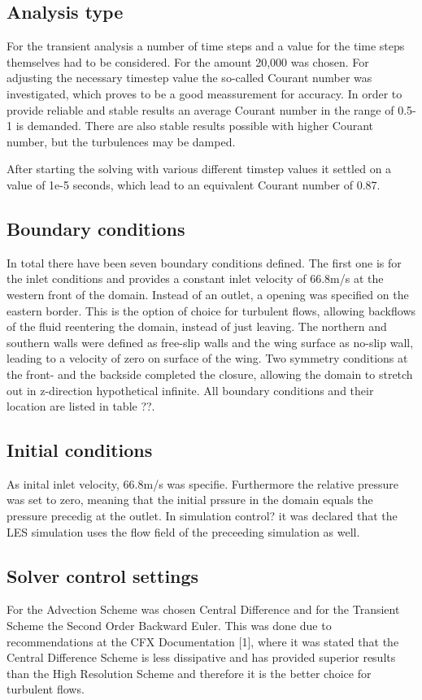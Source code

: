 \subsection{Analysis type}
For the transient analysis a number of time steps and a value for the time steps themselves had to be considered. For the amount 20,000 was chosen. For adjusting the necessary timestep value the so-called Courant number was investigated, which proves to be a good meassurement for accuracy. In order to provide reliable and stable results an average Courant number in the range of 0.5-1 is demanded. There are also stable results possible with higher Courant number, but the turbulences may be damped.

After starting the solving with various different timstep values it settled on a value of 1e-5 seconds, which lead to an equivalent Courant number of 0.87.
\subsection{Boundary conditions}
In total there have been seven boundary conditions defined. The first one is for the inlet conditions and provides a constant inlet velocity of 66.8m/s at the western front of the domain. Instead of an outlet, a opening was specified on the eastern border. This is the option of choice for turbulent flows, allowing backflows of the fluid reentering the domain, instead of just leaving. The northern and southern walls were defined as free-slip walls and the wing surface as no-slip wall, leading to a velocity of zero on surface of the wing. Two symmetry conditions at the front- and the backside completed the closure, allowing the domain to stretch out in z-direction hypothetical infinite. All boundary conditions and their location are listed in table ??.
\subsection{Initial conditions}
As inital inlet velocity, 66.8m/s was specifie. Furthermore the relative pressure was set to zero, meaning that the initial prssure in the domain equals the pressure precedig at the outlet.
In simulation control? it was declared that the LES simulation uses the flow field of the preceeding simulation as well.
\subsection{Solver control settings}
For the Advection Scheme was chosen Central Difference and for the Transient Scheme the Second Order Backward Euler. This was done due to recommendations at the CFX Documentation [1], where it was stated that the Central Difference Scheme is less dissipative and has provided superior results than the High Resolution Scheme and therefore it is the better choice for turbulent flows.

